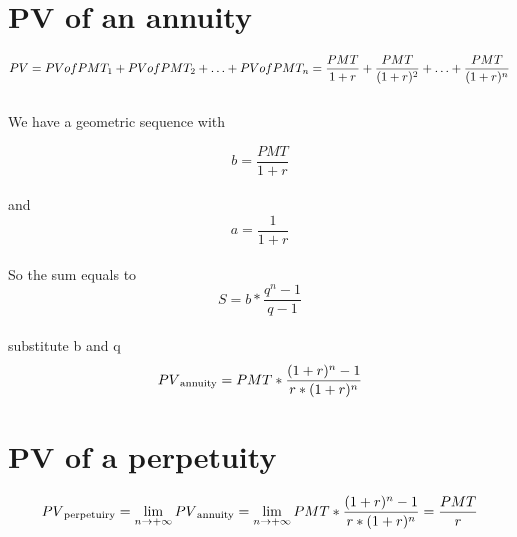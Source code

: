 \documentclass{article}
\begin{document}
\section{PV of an annuity}


\[PV = PVofPMT_1 + PVofPMT_2 + \ldots + PVofPMT_n = \\
\frac{PMT}{1 + r} + \frac{PMT}{(1 + r)^2} + \ldots + \frac{PMT}{(1 + r)^n}\]
\\
\textnormal{We have a geometric sequence with}

\[b = \frac{PMT}{1 + r}\]
\\
\textnormal{and}
\\
\[a = \frac{1}{1 + r}\]
\\
\textnormal{So the sum equals to}
\\
\[S = b * \frac{q^n - 1}{q - 1}\]
\\
\textnormal{substitute b and q}
\\
\[PV\textsubscript{\textnormal{annuity}} = PMT * \frac{(1 + r)^n - 1}{r * (1 + r)^n}\]


\section{PV of a perpetuity}
\[PV\textsubscript{\textnormal{perpetuiry}} = \lim_{n \to +\infty} PV\textsubscript{\textnormal{annuity}} =  \lim_{n \to +\infty} PMT * \frac{(1 + r)^n - 1}{r * (1 + r)^n} = \frac{PMT}{r}\]
\end{document}
